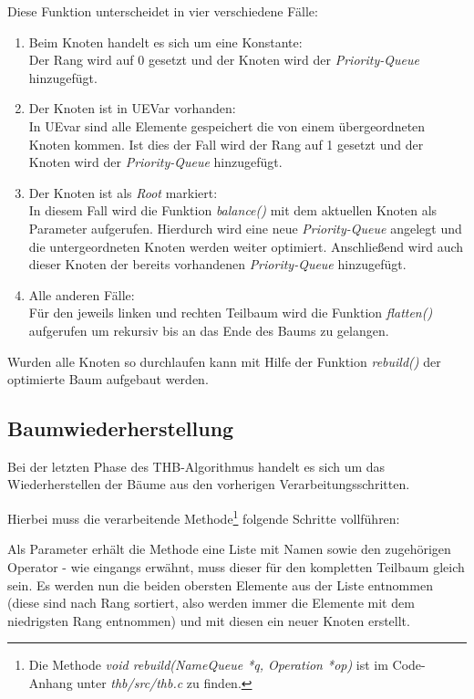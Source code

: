 Diese Funktion unterscheidet in vier verschiedene Fälle:
\begin{enumerate}
	\item Beim Knoten handelt es sich um eine Konstante:\\
	Der Rang wird auf 0 gesetzt und der Knoten wird der \textit{Priority-Queue} hinzugefügt.
	\item Der Knoten ist in UEVar vorhanden:\\
	In UEvar sind alle Elemente gespeichert die von einem übergeordneten Knoten kommen. Ist dies der Fall wird der Rang auf 1 gesetzt und der Knoten wird der \textit{Priority-Queue} hinzugefügt.
	\item Der Knoten ist als \textit{Root} markiert:\\
	In diesem Fall wird die Funktion \textit{balance()} mit dem aktuellen Knoten als Parameter aufgerufen. Hierdurch wird eine neue \textit{Priority-Queue} angelegt und die untergeordneten Knoten werden weiter optimiert. Anschließend wird auch dieser Knoten der bereits vorhandenen \textit{Priority-Queue} hinzugefügt.
	\item Alle anderen Fälle:\\
	Für den jeweils linken und rechten Teilbaum wird die Funktion \textit{flatten()} aufgerufen um rekursiv bis an das Ende des Baums zu gelangen.
\end{enumerate}

Wurden alle Knoten so durchlaufen kann mit Hilfe der Funktion \textit{rebuild()} der optimierte Baum aufgebaut werden.

\subsection{Baumwiederherstellung}

Bei der letzten Phase des \ac{THB}-Algorithmus handelt es sich um das Wiederherstellen der Bäume aus den vorherigen Verarbeitungsschritten.

Hierbei muss die verarbeitende Methode\footnote{Die Methode \textit{void rebuild(NameQueue *q, Operation *op)} ist im Code-Anhang unter \textit{thb/src/thb.c} zu finden.} folgende Schritte vollführen:

Als Parameter erhält die Methode eine Liste mit Namen sowie den zugehörigen Operator - wie eingangs erwähnt, muss dieser für den kompletten Teilbaum gleich sein. Es werden nun die beiden obersten Elemente aus der Liste entnommen (diese sind nach Rang sortiert, also werden immer die Elemente mit dem niedrigsten Rang entnommen) und mit diesen ein neuer Knoten erstellt.

